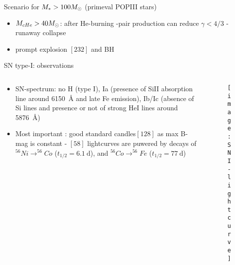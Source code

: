 \begin{frame}{Scenario for $M_*>100M_{\odot}$ (primeval POPIII stars)}
\begin{itemize}
\item $M_{cHe}>40M_{\odot}$: after He-burning \Pelectron-\APelectron pair production can reduce $\gamma<4/3$ - runaway collapse
\item prompt explosion $[232]$ and BH 
\end{itemize}
\end{frame}

\begin{frame}{SN type-I: observations}
\begin{columns}[T]
	\begin{column}{0.6\textwidth}
		\begin{itemize}
			\item SN-spectrum: no H (type I), Ia (presence of SiII absorption line around \SI{6150}{\angstrom} and late Fe emission), Ib/Ic (absence of Si lines and presence or not of strong HeI lines around \SI{5876}{\angstrom})
			\item Most important : good standard candles$[128]$ as max B-mag is constant - $[58]$ lightcurves are puwered by decays of $^{56}Ni\to^{56}Co$ ($t_{1/2}=\SI{6.1}{\day}$), and $^{56}Co\to^{56}Fe$ ($t_{1/2}=\SI{77}{\day}$) 
		\end{itemize}
	\end{column}
	\begin{column}{0.4\textwidth}
		\begin{figure}[!ht]
			\texttt{[image: SNI-lightcurve]}\label{fig:SNI-lightcurve}
		\end{figure}
\end{column}\end{columns}
\end{frame}

